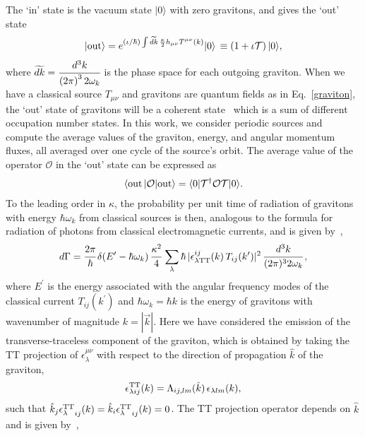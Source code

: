 \documentclass[aps,prd]{revtex4-2}
\begin{document}
The `in' state is the vacuum state $|0\rangle$ with zero gravitons, and gives the `out' state
\begin{equation}
|{\rm{out}} \rangle = e^{(\iota/\hbar) \int \widetilde{dk}\, \frac{\kappa}{2}h_{\mu \nu}T^{\mu \nu}(k)} |0\rangle\,\equiv \left(1 + \iota \mathcal{T}\right)|0\rangle,
\end{equation}
where $
\widetilde{dk} = \cfrac{d^{3}k}{\left(2\pi\right)^3 2\omega_{k}}$ is the phase space for each outgoing graviton. When we have a classical source $T_{\mu \nu}$ and gravitons are quantum fields as in Eq.~\eqref{graviton}, the `out' state of gravitons will be a coherent state~\cite{Britto:2021pud, Kanno:2025how} which is a sum of different occupation number states. In this work, we consider periodic sources and compute the average values of the graviton, energy, and angular momentum fluxes, all averaged over one cycle of the source's orbit. The average value of the operator $\mathcal{O}$ in the `out' state can be expressed as
\begin{eqnarray}
    \langle  \rm{out}\, | {\mathcal{O}}| \rm{out} \rangle= \langle 0 | \mathcal{T}^{\dagger} {\mathcal{O} } \mathcal{T} |0\rangle.
\end{eqnarray}
To the leading order in $\kappa$, the probability per unit time of radiation of gravitons with energy $\hbar\omega_k$ from classical sources is then, analogous to the formula for radiation of photons from classical electromagnetic currents, and is given by~\cite{Heitler:1936jqw, harris2014pedestrian},
\begin{eqnarray}
    d\Gamma = \cfrac{2\pi}{\hbar} \,\delta( E^\prime- \hbar\omega_k)\, \cfrac{\kappa^2}{4}\,\sum_\lambda \hbar\,|\epsilon^{ij}_{\lambda \rm TT}(k)\,T_{i j}(k^\prime)|^2\,\cfrac {d^3k}{(2\pi)^3 2 \omega_k }\,,
    \label{dgamma}
\end{eqnarray}
where $E^\prime$ is the energy associated with the angular frequency modes of the classical current $T_{ij}(k^\prime)$ and $\hbar\omega_k=\hbar k$ is the energy of gravitons with wavenumber of magnitude $k=|\vec k|$. Here we have considered the emission of the transverse-traceless component of the graviton, which is obtained by taking the TT projection of $\epsilon^{\mu \nu}_{\lambda}$ with respect to the direction of propagation $\hat{k}$ of the graviton,
\begin{eqnarray}\label{TTP} 
   \epsilon^{\rm TT}_{\lambda ij} (k)= {\Lambda_{ij, lm}}(\hat k)\, \epsilon_{\lambda lm }(k),
\end{eqnarray}
such that $\hat k_j {\epsilon^{\rm TT}_{\lambda}}_{ij}(k)=\hat k_i {\epsilon^{\rm TT}_{\lambda}}_{ij}(k)=0$. The TT projection operator depends on $\hat k$ and is given by~\cite{Weinberg:1972kfs, Maggiore:2007ulw},
\end{document}
